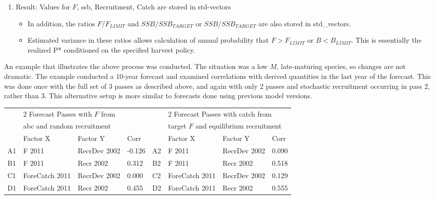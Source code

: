 \begin{itemize}
\begin{enumerate}
\begin{enumerate}
			\item Result: Values for $F$, \gls{ssb}, Recruitment, Catch are stored in std-vectors
			\begin{itemize}
				\item In addition, the ratios $F$/$F_{LIMIT}$ and $SSB/SSB_{TARGET}$ or $SSB/SSB_{TARGET}$ are also stored in std\_vectors.
				\item Estimated variance in these ratios allows calculation of annual probability that $F > F_{LIMIT}$ or $B < B_{LIMIT}$. This is essentially the realized P* conditioned on the specified harvest policy.
			\end{itemize}
		\end{enumerate}
	\end{enumerate}
\end{itemize}

An example that illustrates the above process was conducted. The situation was a low $M$, late-maturing species, so changes are not dramatic. The example conducted a 10-year forecast and examined correlations with derived quantities in the last year of the forecast. This was done once with the full set of 3 passes as described above, and again with only 2 passes and stochastic recruitment occurring in pass 2, rather than 3. This alternative setup is more similar to forecasts done using previous model versions.

\begin{center}
	\begin{longtable}{p{0.4cm} p{2.75cm} p{3cm} p{1cm} p{0.4cm} p{2.75cm} p{2cm} p{1cm}}
		\hline
		 & \multicolumn{3}{l}{2 Forecast Passes with $F$ from} & & \multicolumn{3}{l}{2 Forecast Passes with catch from} \\
		 & \multicolumn{3}{l}{\gls{abc} and random recruitment} & & \multicolumn{3}{l}{target $F$ and equilibrium recruitment} \\
		\hline
		 & Factor X & Factor Y & Corr & & Factor X & Factor Y & Corr \\
		\hline
		A1 & F 2011 & RecrDev 2002 & -0.126 & A2 & F 2011 & RecrDev 2002 & 0.090 \\
		B1 & F 2011 & Recr 2002 & 0.312 & B2 & F 2011 & Recr 2002 & 0.518 \\
		C1 & ForeCatch 2011 & RecrDev 2002 & 0.000 & C2 & ForeCatch 2011 & RecrDev 2002 & 0.129 \\
		D1 & ForeCatch 2011 & Recr 2002 & 0.455 & D2 & ForeCatch 2011 & Recr 2002 & 0.555 \\
		\hline		
	\end{longtable}
\end{center}

